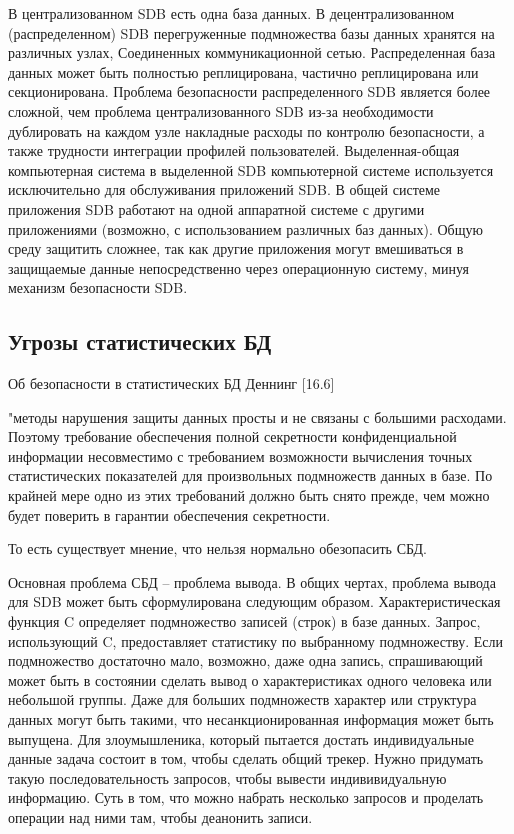 \begin{itemize}
В централизованном SDB есть одна база данных. В децентрализованном (распределенном) SDB перегруженные подмножества базы данных хранятся на различных узлах, Соединенных коммуникационной сетью. Распределенная база данных может быть полностью реплицирована, частично реплицирована или секционирована. Проблема безопасности распределенного SDB является более сложной, чем проблема централизованного SDB из-за необходимости дублировать на каждом узле накладные расходы по контролю безопасности, а также трудности интеграции профилей пользователей.
Выделенная-общая компьютерная система в выделенной SDB компьютерной системе используется исключительно для обслуживания приложений SDB. В общей системе приложения SDB работают на одной аппаратной системе с другими приложениями (возможно, с использованием различных баз данных). Общую среду защитить сложнее, так как другие приложения могут вмешиваться в защищаемые данные непосредственно через операционную систему, минуя механизм безопасности SDB.
\end{itemize}
\subsection{Угрозы статистических БД}

Об безопасности в статистических БД  Деннинг [16.6]
\begin{grayquote}
"методы нарушения защиты данных просты и не связаны с большими расходами. Поэтому требование обеспечения полной секретности конфиденциальной информации несовместимо с требованием возможности вычисления точных статистических показателей для произвольных подмножеств данных в базе. По крайней мере одно из этих требований должно быть снято прежде, чем можно будет поверить в гарантии обеспечения секретности.
\end{grayquote}
То есть существует мнение, что нельзя нормально обезопасить СБД.

Основная проблема СБД -- проблема вывода.
В общих чертах, проблема вывода для SDB может быть сформулирована следующим образом. Характеристическая функция C определяет подмножество записей (строк) в базе данных. Запрос, использующий C, предоставляет статистику по выбранному подмножеству. Если подмножество достаточно мало, возможно, даже одна запись, спрашивающий может быть в состоянии сделать вывод о характеристиках одного человека или небольшой группы. Даже для больших подмножеств характер или структура данных могут быть такими, что несанкционированная информация может быть выпущена.
Для злоумышленика, который пытается достать индивидуальные данные задача состоит в том, чтобы сделать общий трекер.
Нужно придумать такую последовательность запросов, чтобы вывести индививидуальную информацию.
Суть в том, что можно набрать несколько запросов и проделать операции над ними там, чтобы деанонить записи.

